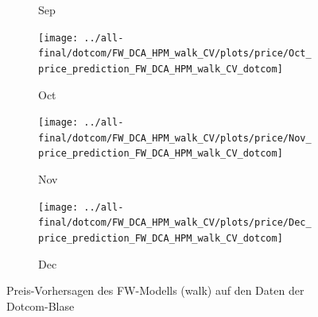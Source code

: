 \documentclass[ngerman]{ttlab-qualify}
\begin{document}
\begin{figure}[H]
\begin{subfigure}{.3\linewidth}
  \caption{Sep}
  \end{subfigure}\par\medskip
  \begin{subfigure}{.3\linewidth}
  \texttt{[image: ../all-final/dotcom/FW\_DCA\_HPM\_walk\_CV/plots/price/Oct\_price\_prediction\_FW\_DCA\_HPM\_walk\_CV\_dotcom]}\hfill
  \caption{Oct}
  \end{subfigure}
  \begin{subfigure}{.3\linewidth}
  \texttt{[image: ../all-final/dotcom/FW\_DCA\_HPM\_walk\_CV/plots/price/Nov\_price\_prediction\_FW\_DCA\_HPM\_walk\_CV\_dotcom]}\hfill
  \caption{Nov}
  \end{subfigure}
  \begin{subfigure}{.3\linewidth}
  \texttt{[image: ../all-final/dotcom/FW\_DCA\_HPM\_walk\_CV/plots/price/Dec\_price\_prediction\_FW\_DCA\_HPM\_walk\_CV\_dotcom]}\hfill
  \caption{Dec}
  \end{subfigure}
  \caption{Preis-Vorhersagen des FW-Modells (walk) auf den Daten der Dotcom-Blase}
\end{figure}
\end{document}
